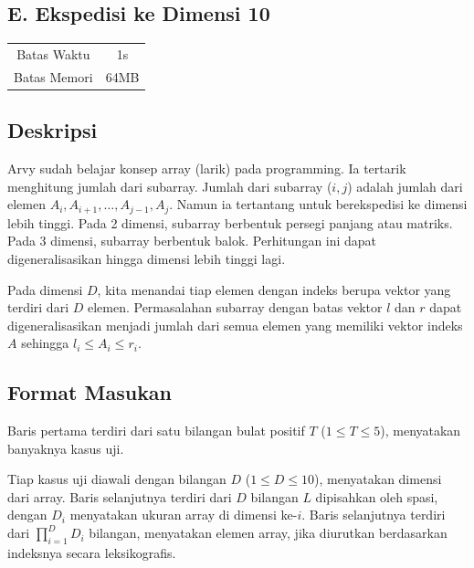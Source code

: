 \documentclass{article}
\begin{document}
\begin{center}
    \section*{E. Ekspedisi ke Dimensi 10} %

    \begin{tabular}{ | c c | }
        \hline
        Batas Waktu  & 1s \\    %
        Batas Memori & 64MB \\  %
        \hline
    \end{tabular}
\end{center}

\subsection*{Deskripsi}

Arvy sudah belajar konsep array (larik) pada programming.
Ia tertarik menghitung jumlah dari subarray.
Jumlah dari subarray ($i, j$) adalah jumlah dari elemen $A_i, A_{i+1}, \dots, A_{j-1}, A_j$.
Namun ia tertantang untuk berekspedisi ke dimensi lebih tinggi.
Pada 2 dimensi, subarray berbentuk persegi panjang atau matriks.
Pada 3 dimensi, subarray berbentuk balok.
Perhitungan ini dapat digeneralisasikan hingga dimensi lebih tinggi lagi.

Pada dimensi $D$, kita menandai tiap elemen dengan indeks berupa vektor yang terdiri dari $D$ elemen.
Permasalahan subarray dengan batas vektor $l$ dan $r$ dapat digeneralisasikan menjadi jumlah dari semua elemen yang memiliki vektor indeks $A$ sehingga $l_i \leq A_i \leq r_i$.

\subsection*{Format Masukan}

Baris pertama terdiri dari satu bilangan bulat positif $T$ ($1 \leq T \leq 5$), menyatakan banyaknya kasus uji.

Tiap kasus uji diawali dengan bilangan $D$ ($1 \leq D \leq 10$), menyatakan dimensi dari array.
Baris selanjutnya terdiri dari $D$ bilangan $L$ dipisahkan oleh spasi, dengan $D_i$ menyatakan ukuran array di dimensi ke-$i$.
Baris selanjutnya terdiri dari $\prod_{i=1}^{D}{D_i}$ bilangan, menyatakan elemen array, jika diurutkan berdasarkan indeksnya secara leksikografis.
\end{document}
